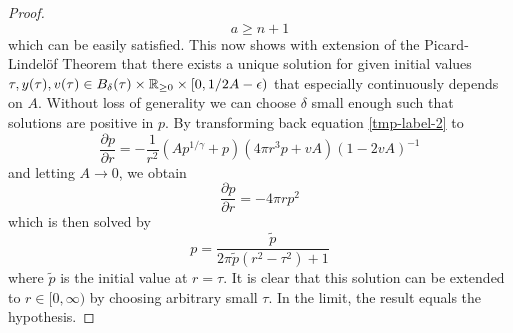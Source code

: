 \begin{appendix}
\begin{section}
\begin{proof}
	\begin{equation}
		a\geq n+1
	\end{equation}
	which can be easily satisfied. 
	This now shows with extension of the Picard-Lindelöf Theorem that there exists a unique solution for given initial values $\tau, y(\tau), v(\tau)\in B_{\delta}(\tau)\times\mathbb{R}_{\geq0}\times[0,1/2A-\epsilon)$ that especially continuously depends on $A$.
	Without loss of generality we can choose $\delta$ small enough such that solutions are positive in $p$.
	By transforming back equation \ref{tmp-label-2} to 
	\begin{equation}
		\frac{\partial p}{\partial r} = -\frac{1}{r^2}\left(Ap^{1/\gamma}+p\right)\left(4\pi r^3p+vA\right)\left(1-2vA\right)^{-1}
	\end{equation}
	and letting $A\rightarrow0$, we obtain
	\begin{equation}
		\frac{\partial p}{\partial r} = - 4\pi rp^2
	\end{equation}
	which is then solved by
	\begin{equation}
		p = \frac{\tilde{p}}{2\pi\tilde{p}(r^2-\tau^2)+1}
	\end{equation}
	where $\tilde{p}$ is the initial value at $r=\tau$. It is clear that this solution can be extended to $r\in[0,\infty)$ by choosing arbitrary small $\tau$.
	In the limit, the result equals the hypothesis.
\end{proof}
%
%
%

\end{section}
\end{appendix}
